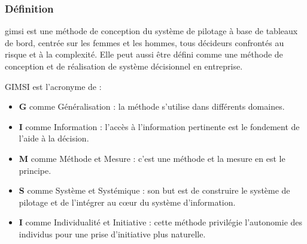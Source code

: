             \subsubsection[Définition]{Définition}
            \acrshort*{gimsi} est une méthode de conception du système de pilotage à base 
            de tableaux de bord, centrée sur les femmes et les hommes,
            tous décideurs confrontés au risque et à la complexité. \cite*{fernandez2021gimsi} Elle
            peut aussi être défini comme une méthode de conception et de réalisation de
            système décisionnel en entreprise.
            \par
            GIMSI est l’acronyme de :
            \par
            \begin{itemize}
                \setlength{\itemsep}{0pt}
                \item [\ding{226}] \textbf{G} comme Généralisation :
                la méthode s’utilise dans différents domaines.
                \item [\ding{226}] \textbf{I} comme Information : l’accès à l’information
                pertinente est le fondement de l’aide à la décision.
                \item [\ding{226}] \textbf{M} comme Méthode et Mesure : c’est une méthode
                et la mesure en est le principe.
                \item [\ding{226}] \textbf{S} comme Système et Systémique : son but est de construire le système de pilotage
                et de l’intégrer au cœur du système d’information.
                \item [\ding{226}] \textbf{I} comme Individualité et Initiative : cette méthode privilégie
                l’autonomie des individus pour une prise d’initiative plus naturelle.
            \end{itemize}
